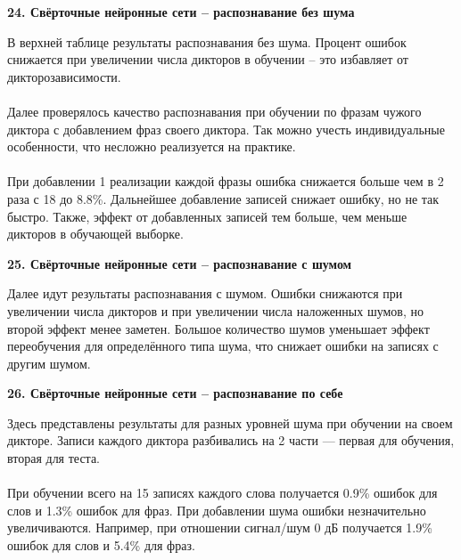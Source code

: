 \documentclass[a4paper, 12pt]{article}
\begin{document}
	
	
	\begin{center}
		\textbf{\large 24. Свёрточные нейронные сети – распознавание без шума}
	\end{center}	
	\noindent
	В верхней таблице результаты распознавания без шума. Процент ошибок снижается при увеличении числа дикторов в обучении – это избавляет от дикторозависимости.
	\\\\
	Далее проверялось качество распознавания при обучении по фразам чужого диктора с добавлением фраз своего диктора. Так можно учесть индивидуальные особенности, что несложно реализуется на практике.
	\\\\
	При добавлении 1 реализации каждой фразы ошибка снижается больше чем в 2 раза с 18 до 8.8\%. Дальнейшее добавление записей снижает ошибку, но не так быстро. Также, эффект от добавленных записей тем больше, чем меньше дикторов в обучающей выборке.
	
	
	
	\begin{center}
		\textbf{\large 25. Свёрточные нейронные сети – распознавание с шумом}
	\end{center}	
	\noindent
	Далее идут результаты распознавания с шумом. Ошибки снижаются при увеличении числа дикторов и при увеличении числа наложенных шумов, но второй эффект менее заметен. Большое количество шумов уменьшает эффект переобучения для определённого типа шума, что снижает ошибки на записях с другим шумом.
	
	
	
	\begin{center}
		\textbf{\large 26. Свёрточные нейронные сети – распознавание по себе}
	\end{center}	
	\noindent
	Здесь представлены результаты для разных уровней шума при обучении на своем дикторе. Записи каждого диктора разбивались на 2 части — первая для обучения, вторая для теста.
	\\\\
	При обучении всего на 15 записях каждого слова получается 0.9\% ошибок для слов и 1.3\% ошибок для фраз. При добавлении шума ошибки незначительно увеличиваются. Например, при отношении сигнал/шум 0 дБ получается 1.9\% ошибок для слов и 5.4\% для фраз.
	
	
	
\end{document}
